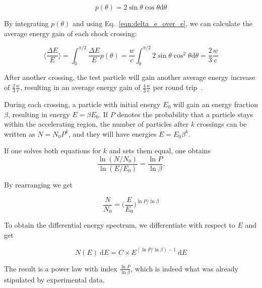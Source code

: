 \begin{equation}
  p(\theta) = 2\sin{\theta}\cos{\theta} \text{d}\theta
\end{equation}

By integrating $p(\theta)$ and using Eq.~\ref{eqn:delta_e_over_e}, we can calculate the average energy gain of each shock crossing:

\begin{equation}
  \bigg\langle \frac{\Delta E}{E} \bigg\rangle = \int_0^{\pi/2} \frac{\Delta E}{E} p(\theta) = \frac{w}{c} \int_0^{\pi/2} 2 \sin{\theta} \cos^2{\theta}  \text{d}\theta = \frac{2}{3}\frac{w}{c}
\end{equation}

After another crossing, the test particle will gain another average energy increase of $\frac{2}{3}\frac{w}{c}$, resulting in an average energy gain of $\frac{4}{3}\frac{w}{c}$ per round trip~\cite{Longair2011}.

During each crossing, a particle with initial energy $E_0$ will gain an energy fraction $\beta$, resulting in energy $E=\beta E_0$. If $P$ denotes the probability that a particle stays within the accelerating region, the number of particles after $k$ crossings can be written as $N=N_0 P^k $, and they will have energies $E=E_0\beta^k$.

If one solves both equations for $k$ and sets them equal, one obtains
\begin{equation}
  \frac{\ln (N/N_0)}{\ln (E/E_0)} = \frac{\ln P}{\ln \beta}.
\end{equation}

By rearranging we get

\begin{equation}
  \frac{N}{N_0} = \bigg(\frac{E}{E_0}\bigg)^{\ln P / \ln \beta}
\end{equation}

To obtain the differential energy spectrum, we differentiate with respect to $E$ and get

\begin{equation}
  \label{eqn:diff_e_spec}
  N(E)~\text{d} E = C\times E^{(\ln P/\ln\beta)-1}~\text{d} E
\end{equation}

The result is a power law with index $\frac{\ln P}{\ln \beta}$, which is indeed what was already stipulated by experimental data.

